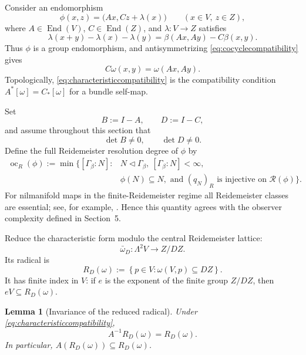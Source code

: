 \documentclass[11pt]{article}
\newtheorem{lemma}[theorem]{Lemma}
\DeclareMathOperator{\End}{End}
\DeclareMathOperator{\oc}{oc}
\newcommand{\RN}{\mathcal R}
\begin{document}
Consider an endomorphism
\[
  \phi(x,z)=\bigl(Ax,Cz+\lambda(x)\bigr)
  \qquad (x\in V,\ z\in Z),
\]
where $A\in\End(V)$, $C\in\End(Z)$, and $\lambda\colon V\to Z$ satisfies
\begin{equation}
  \lambda(x+y)-\lambda(x)-\lambda(y)
  =\beta(Ax,Ay)-C\beta(x,y).
  \label{eq:cocyclecompatibility}
\end{equation}
Thus $\phi$ is a group endomorphism, and antisymmetrizing
\eqref{eq:cocyclecompatibility} gives
\begin{equation}
  C\omega(x,y)=\omega(Ax,Ay).
  \label{eq:characteristiccompatibility}
\end{equation}
Topologically, \eqref{eq:characteristiccompatibility} is the compatibility
condition $A^*[\omega]=C_*[\omega]$ for a bundle self-map.

Set
\[
  B:=I-A,
  \qquad
  D:=I-C,
\]
and assume throughout this section that
\begin{equation}
  \det B\ne0,
  \qquad
  \det D\ne0.
  \label{eq:finiteRregime}
\end{equation}
Define the full Reidemeister resolution degree of $\phi$ by
\begin{align*}
  \oc_R(\phi):=\min\bigl\{[\Gamma_\beta:N]:{}&
  N\triangleleft\Gamma_\beta,\ [\Gamma_\beta:N]<\infty,\\
  &\phi(N)\subseteq N,\text{ and }(q_N)_R
  \text{ is injective on }\RN(\phi)\bigr\}.
\end{align*}
For nilmanifold maps in the finite-Reidemeister regime all Reidemeister classes
are essential; see, for example,
\cite{DekimpeDugardein,FelLee,DeconinckDekimpe}.  Hence this quantity agrees
with the observer complexity defined in Section~5.

Reduce the characteristic form modulo the central Reidemeister lattice:
\[
  \bar\omega_D\colon\Lambda^2V\longrightarrow Z/DZ.
\]
Its radical is
\begin{equation}
  R_D(\omega)
  :=\left\{p\in V:\omega(V,p)\subseteq DZ\right\}.
  \label{eq:reducedradical}
\end{equation}
It has finite index in $V$: if $e$ is the exponent of the finite group
$Z/DZ$, then $eV\subseteq R_D(\omega)$.

\begin{lemma}[Invariance of the reduced radical]
\label{lem:radicalinvariance}
Under \eqref{eq:characteristiccompatibility},
\[
  A^{-1}R_D(\omega)=R_D(\omega).
\]
In particular, $A(R_D(\omega))\subseteq R_D(\omega)$.
\end{lemma}
\end{document}
